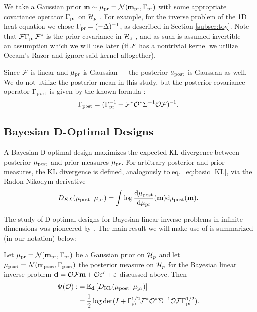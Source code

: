 We take a Gaussian prior \(\mathbf{m} \sim \mu_{\textup{pr}} = \mathcal{N}(\mathbf{m}_{\textup{pr}}
,\Gamma_{\textup{pr}})\) with some appropriate covariance operator \(\Gamma_{\textup{pr}}\) on
\(\mathcal{H}_p\) \cite{Stuart10}. For example, for the inverse problem of the
1D heat equation we chose $\Gamma_{\textup{pr}} = (-\Delta)^{-1}$, as described in
Section \ref{subsec:toy}. Note that \(\mathcal{F} \Gamma_{\textup{pr}} \mathcal{F}^*\) is the
prior covariance in \(\mathcal{H}_o\) \cite{Stuart10}, and as such is assumed
invertible --- an assumption which we will use later (if \(\mathcal{F}\) has
a nontrivial kernel we utilize Occam's Razor and ignore said kernel
altogether).

Since $\mathcal{F}$ is linear and $\mu_{\textup{pr}}$ is Gaussian --- the posterior
\(\mu_{\textup{post}}\) is Gaussian as well. We do not utilize the posterior mean in
this study, but the posterior covariance operator $\Gamma_{\textup{post}}$ is given
by the known formula \cite{Stuart10}:
\begin{align}\label{eq:postcov}
  \postcov = (\prcov^{-1} + \fwd^* \obs^* \Sigma^{-1} \obs \fwd
  )^{-1}.
\end{align}

\subsection{Bayesian D-Optimal Designs}\label{subsec:D_optimal_design} 
A Bayesian D-optimal design maximizes the expected KL divergence
between posterior \(\mu_{\textup{post}}\) and prior measures \(\mu_{\textup{pr}}\). For arbitrary
posterior and prior measures, the KL divergence is defined,
analogously to eq.~\eqref{eq:basic_KL}, via the Radon-Nikodym
derivative:
\begin{equation*}
  D_{KL}(\post||\pr) = \int \log \frac{\der \post}{\der \pr}(\param) \der \post(\param).
\end{equation*}

The study of D-optimal designs for Bayesian linear inverse problems in
infinite dimensions was pioneered by \cite{AlexanderianGloorGhattas14,
  alexanderian2018efficient}. The main result we will make use of is
summarized (in our notation) below:

\begin{theorem}\label{thm:d_optimality}
  Let \(\mu_{\textup{pr}} = \mathcal{N}(\mathbf{m}_{\textup{pr}},\Gamma_{\textup{pr}})\) be a Gaussian prior on \(\mathcal{H}_p\)
  and let \(\mu_{\textup{post}} = \mathcal{N}(\mathbf{m}_{\textup{post}},\Gamma_{\textup{post}})\) the posterior measure
  on \(\mathcal{H}_p\) for the Bayesian linear inverse problem \(\mathbf{d} = \mathcal{O}
  \mathcal{F}\mathbf{m} + \mathcal{O} \varepsilon' + \varepsilon\) discussed above. Then
  \begin{align}\label{eq:objective}
    \begin{split}
      \tar( \obs) :&= \mathbb{E}_{\data}\left [ D_{\text{KL}} (\post || \pr ) \right ] \\
      &= \frac12 \log \det 
      ( I + \prcov^{1/2}  \fwd ^* \obs^* \Sigma^{-1} \obs \fwd \prcov^{1/2}).
    \end{split}
  \end{align}
\end{theorem}

